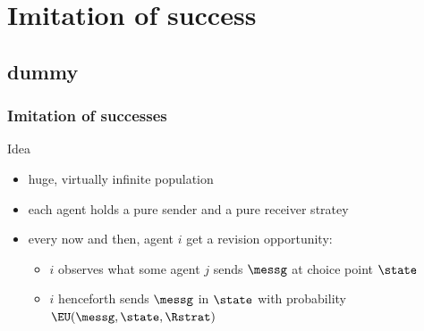 \documentclass[fleqn,9pt,xcolor=dvipsnames]{beamer}
\begin{document}
\section{Imitation of success}
\subsection{dummy}

\begin{frame}
  \frametitle{Imitation of successes}
  
  \begin{block}{Idea}
  \begin{itemize}
  \item huge, virtually infinite population
  \item each agent holds a pure sender and a pure receiver stratey
  \item every now and then, agent $i$ get a revision opportunity:
    \begin{itemize}
    \item $i$ observes what some agent $j$ sends $\messg$ at choice point $\state$
    \item $i$ henceforth sends $\messg$ in $\state$ with probability $\EU(\messg, \state, \Rstrat)$
    \end{itemize}
  \end{itemize}
\end{block}

\end{frame}
\end{document}
